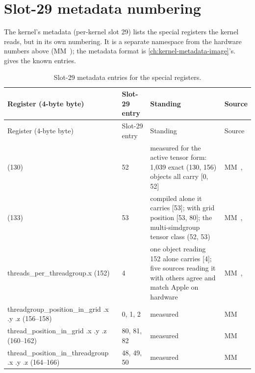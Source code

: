 \section{Slot-29 metadata numbering}\label{sec:slot-29-metadata-numbering}

The kernel's metadata (per-kernel slot 29) lists the special registers the kernel reads, but in its own numbering. It is a
separate namespace from the hardware numbers above (MM~); the metadata format is \cref{ch:kernel-metadata-image}'s.  gives the known entries.

\begin{xltabular}{\linewidth}{@{}Xl>{\hsize}X>{\hsize}X@{}}
\caption{Slot-29 metadata entries for the special registers.}\label{tab:slot-29-entries}\\
\toprule
Register (4-byte byte) & Slot-29 entry & Standing & Source \\
\midrule
\endfirsthead
{}
\toprule
Register (4-byte byte) & Slot-29 entry & Standing & Source \\
\midrule
\endhead
{} (130) & 52 & measured for the active tensor form: 1,039 exact (130, 156) objects all
carry {[}0, 52{]} & MM~,  \\*
 (133) & 53 & compiled alone it carries {[}53{]}; with grid position {[}53, 80{]}; the
multi-simdgroup tensor class (52, 53) & MM~,  \\*
threads\_per\_threadgroup.x (152) & 4 & one object reading 152 alone carries {[}4{]}; five sources reading it
with others agree and match Apple on hardware & MM~,  \\*
threadgroup\_position\_in\_grid .x .y .z (156–158) & 0, 1, 2 & measured & MM~ \\*
thread\_position\_in\_grid .x .y .z (160–162) & 80, 81, 82 & measured & MM~ \\*
thread\_position\_in\_threadgroup .x .y .z (164–166) & 48, 49, 50 & measured & MM~ \\*
\bottomrule
\end{xltabular}

